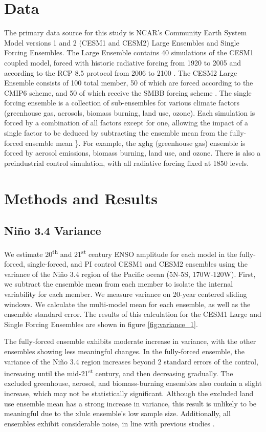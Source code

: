\documentclass[11pt]{article}
\begin{document}
\section{Data}

The primary data source for this study is NCAR's Community Earth System Model versions 1 and 2 (CESM1 and CESM2) Large Ensembles and Single Forcing Ensembles. The Large Ensemble contains 40 simulations of the CESM1 coupled model, forced with historic radiative forcing from 1920 to 2005 and according to the RCP 8.5 protocol from 2006 to 2100 \citep{kay2015community}. The CESM2 Large Ensemble consists of 100 total member, 50 of which are forced according to the CMIP6 scheme, and 50 of which receive the SMBB forcing scheme \citep{danabasoglu2020community}. The single forcing ensemble is a collection of sub-ensembles for various climate factors (greenhouse gas, aerosols, biomass burning, land use, ozone). Each simulation is forced by a combination of all factors except for one, allowing the impact of a single factor to be deduced by subtracting the ensemble mean from the fully-forced ensemble mean \citep{deser2020isolating}\}. For example, the xghg (greenhouse gas) ensemble is forced by aerosol emissions, biomass burning, land use, and ozone. There is also a preindustrial control simulation, with all radiative forcing fixed at 1850 levels.

\section{Methods and Results}

\subsection{Niño 3.4 Variance}

We estimate 20\textsuperscript{th} and 21\textsuperscript{st} century ENSO amplitude for each model in the fully-forced, single-forced, and PI control CESM1 and CESM2 ensembles using the variance of the Niño 3.4 region of the Pacific ocean (5N-5S, 170W-120W). First, we subtract the ensemble mean from each member to isolate the internal variability for each member. We measure variance on 20-year centered sliding windows. We calculate the multi-model mean for each ensemble, as well as the ensemble standard error. The results of this calculation  for the CESM1 Large and Single Forcing Ensembles are shown in figure \ref{fig:variance_1}.

The fully-forced ensemble exhibits moderate increase in variance, with the other ensembles showing less meaningful changes. In the fully-forced ensemble, the variance of the Niño 3.4 region increases beyond 2 standard errors of the control, increasing until the mid-21\textsuperscript{st} century, and then decreasing gradually. The excluded greenhouse, aerosol, and biomass-burning ensembles also contain a slight increase, which may not be statistically significant. Although the excluded land use ensemble mean has a strong increase in variance, this result is unlikely to be meaningful due to the xlulc ensemble's low sample size. Additionally, all ensembles exhibit considerable noise, in line with previous studies \citep{maher2018enso}.
\end{document}
